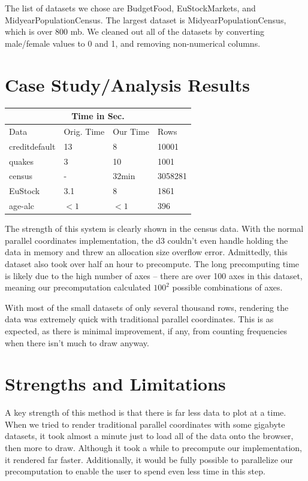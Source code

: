\documentclass[	DIV=calc,%
			paper=a4,%
			fontsize=11pt,%
			twocolumn]{scrartcl}					%
\begin{document}
The list of datasets we chose are BudgetFood, EuStockMarkets, and MidyearPopulationCensus. The largest dataset is MidyearPopulationCensus, which is over 800 mb. We
cleaned out all of the datasets by converting male/female values to 0 and 1, and removing non-numerical columns. 

\section {Case Study/Analysis Results}
\begin{tabular}{ |p{2cm}||p{1cm}||p{1cm}||p{1.2cm}|  }
 \hline
 \multicolumn{4}{|c|}{Time in Sec.} \\
 \hline
 Data& Orig. Time& Our Time & Rows\\
 \hline
 creditdefault& 13 & 8 & 10001\\
 quakes&   3 & 10 & 1001\\
 census &- &32min & 3058281\\
 EuStock &3.1 &8 & 1861\\
 age-alc &$<1$ &$<1$ & 396\\
 \hline
\end{tabular}

The strength of this system is clearly shown in the census data. With the normal 
parallel coordinates implementation, the d3 couldn't even handle holding the data in 
memory and threw an allocation size overflow error. Admittedly, this dataset also
took over half an hour to precompute. The long precomputing time is likely due to
the high number of axes -- there are over 100 axes in this dataset, meaning 
our precomputation calculated $100^2$ possible combinations of axes. 

With most of the small datasets of only several thousand rows, rendering the data
was extremely quick with traditional parallel coordinates. This is as expected, as 
there is minimal improvement, if any, from counting frequencies when there isn't much to draw anyway. 


\section {Strengths and Limitations}
A key strength of this method is that there is far less data to plot at a time. When we tried to render traditional parallel coordinates with some gigabyte datasets, it took almost a minute just to load all of the data onto
the browser, then more to draw. Although it took a while to precompute our implementation, it rendered far faster. Additionally, it would be fully possible to parallelize our
precomputation to enable the user to spend even less time in this step. 
\end{document}
